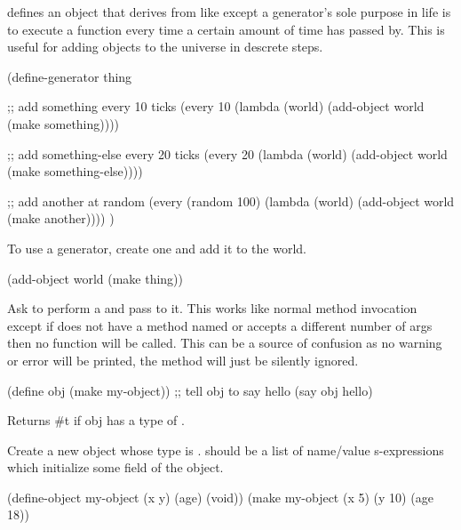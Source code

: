  defines an object that derives from  like  except a generator's sole purpose in life is to execute a function every time a certain amount of time has passed by. This is useful for adding objects to the universe in descrete steps.

\begin{schemedisplay}
(define-generator thing

  ;; add something every 10 ticks
  (every 10 (lambda (world)
	      (add-object world (make something))))

  ;; add something-else every 20 ticks
  (every 20 (lambda (world)
              (add-object world (make something-else))))

  ;; add another at random
  (every (random 100) (lambda (world)
                        (add-object world (make another))))
  )
\end{schemedisplay}

To use a generator, create one and add it to the world.

\begin{schemedisplay}
(add-object world (make thing))
\end{schemedisplay}


Ask  to perform a  and pass  to it. This works like normal method invocation except if  does not have a method named  or accepts a different number of args then no function will be called. This can be a source of confusion as no warning or error will be printed, the method will just be silently ignored.

\begin{schemedisplay}
(define obj (make my-object))
;; tell obj to say hello
(say obj hello)
\end{schemedisplay}


Returns #t if obj has a type of .


Create a new object whose type is .  should be a list of name/value s-expressions which initialize some field of the object.

\begin{schemedisplay}
(define-object my-object (x y) (age) (void))
(make my-object (x 5) (y 10) (age 18))
\end{schemedisplay}

